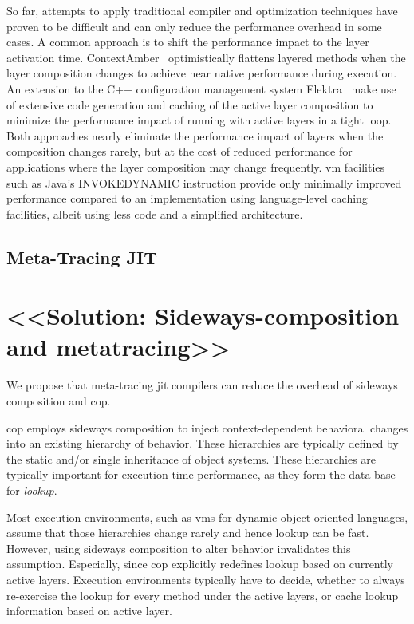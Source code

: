 \documentclass[preprint,english,10pt,nonatbib]{sigplanconf}
\begin{document}
So far, attempts to apply traditional compiler and optimization techniques have
proven to be difficult and can only reduce the performance overhead in some
cases. A common approach is to shift the performance impact to the layer
activation time. ContextAmber~\cite{springer2015efficient} optimistically
flattens layered methods when the layer composition changes to achieve near
native performance during execution. An extension to the C++ configuration
management system Elektra~\cite{Raab:2014:PEE:2637066.2637074} make use of
extensive code generation and caching of the active layer composition to
minimize the performance impact of running with active layers in a tight
loop. Both approaches nearly eliminate the performance impact of layers when the
composition changes rarely, but at the cost of reduced performance for
applications where the layer composition may change frequently. \ac{vm}
facilities such as Java's INVOKEDYNAMIC instruction provide only minimally
improved performance compared to an implementation using language-level caching
facilities, albeit using less code and a simplified architecture.

\subsection{Meta-Tracing JIT}
\label{sec:meta-tracing-jit}

\section{<<Solution: Sideways-composition and metatracing>>}

We propose that meta-tracing \ac{jit} compilers can reduce the overhead of
sideways composition and \ac{cop}.

\Acl{cop} employs sideways composition to inject context-dependent behavioral
changes into an existing hierarchy of behavior. These hierarchies are typically
defined by the static and/or single inheritance of object systems. These
hierarchies are typically important for execution time performance, as they
form the data base for \emph{lookup}.

Most execution environments, such as \acp{vm} for dynamic object-oriented
languages, assume that those hierarchies change rarely and hence lookup can be
fast. However, using sideways composition to alter behavior invalidates this
assumption. Especially, since \ac{cop} explicitly redefines lookup based on
currently active layers. Execution environments typically have to decide,
whether to always re-exercise the lookup for every method under the active
layers, or cache lookup information based on active layer.
\end{document}
